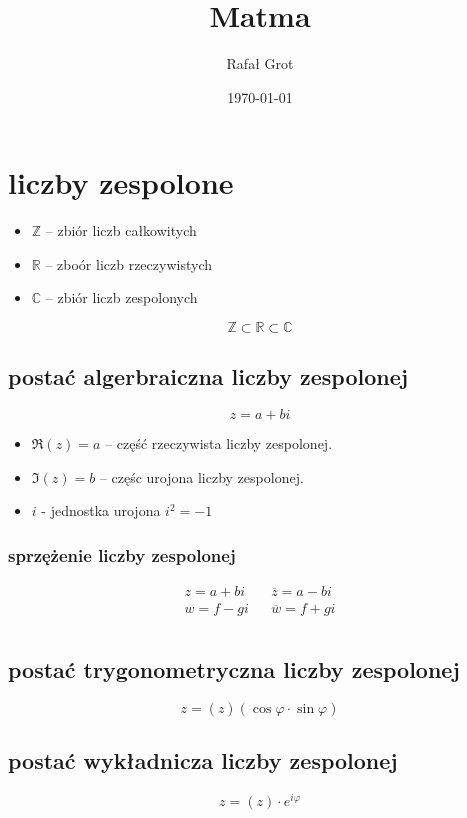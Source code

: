 \documentclass[11pt]{article}
\author{Rafał Grot}
\date{\today}
\title{Matma}
\begin{document}
\maketitle
\tableofcontents


\section{liczby zespolone}
\label{sec:org171be63}
\begin{itemize}
\item \(\mathbb{Z}\) -- zbiór liczb całkowitych
\item \(\mathbb{R}\) -- zboór liczb rzeczywistych
\item \(\mathbb{C}\) -- zbiór liczb zespolonych
\end{itemize}
$$\mathbb{Z} \subset \mathbb{R} \subset \mathbb{C}$$
\subsection{postać algerbraiczna liczby zespolonej}
\label{sec:org6f62e4c}
$$z=a+bi$$

\begin{itemize}
\item \(\Re(z) = a\) -- część rzeczywista liczby zespolonej.
\item \(\Im(z) = b\) -- częśc urojona liczby zespolonej.
\item \(i\) - jednostka urojona \(i^2=-1\)
\end{itemize}
\subsubsection{sprzężenie liczby zespolonej}
\label{sec:orged29b16}
\begin{latex}
\begin{align*}
  z=a+bi && \overline{z}=a-bi \\
  w=f-gi && \overline{w}=f+gi \\
\end{align*}
\end{latex}

\subsection{postać trygonometryczna liczby zespolonej}
\label{sec:org4b3c418}
$$z=(z)(\cos\varphi \cdot \sin\varphi)$$
\subsection{postać wykładnicza liczby zespolonej}
\label{sec:orgadbd8d5}
$$z=(z) \cdot e^{i\varphi}$$
\end{document}
